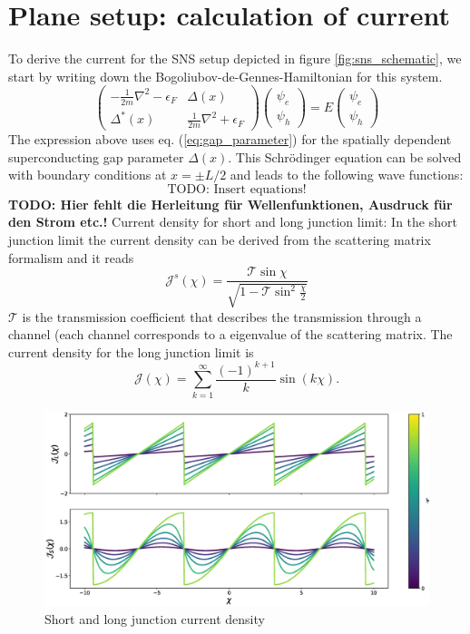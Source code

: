 \section{Plane setup: calculation of current}
To derive the current for the SNS setup depicted in figure \ref{fig:sns_schematic}, we start by writing down the Bogoliubov-de-Gennes-Hamiltonian for this system.
\begin{equation}
\begin{pmatrix}
-\frac{1}{2m} \nabla^2 - \epsilon_F & \Delta(x) \\
\Delta^*(x) & \frac{1}{2m} \nabla^2 + \epsilon_F 
\end{pmatrix}
\begin{pmatrix}
\psi_e \\
\psi_h
\end{pmatrix} = E 
\begin{pmatrix}
\psi_e\\
\psi_h
\end{pmatrix}
\end{equation}
The expression above uses eq. (\ref{eq:gap_parameter}) for the spatially dependent superconducting gap parameter $\Delta(x)$. This Schr\"odinger equation can be solved with boundary conditions at $x = \pm L/2$ and leads to the following wave functions:
\begin{equation}
\text{TODO: Insert equations!}
\end{equation}
\textbf{TODO: Hier fehlt die Herleitung f\"ur Wellenfunktionen, Ausdruck f\"ur den Strom etc.!}
Current density for short and long junction limit: 
In the short junction limit the current density can be derived from the scattering matrix formalism and it reads
\begin{equation}
\mathcal{J}^s (\chi) = \frac{\mathcal{T} \sin \chi}{\sqrt{1 - \mathcal{T} \sin^2 \frac{\chi}{2}}}
\end{equation}
$\mathcal{T}$ is the transmission coefficient that describes the transmission through a channel (each channel corresponds to a eigenvalue of the scattering matrix.
The current density for the long junction limit is
\begin{equation}
\mathcal{J}(\chi) = \sum_{k = 1}^{\infty} \frac{(-1)^{k+1}}{k} \sin( k \chi).
\end{equation}
\begin{figure}
\centering
\includegraphics[width=\textwidth]{figure/analyticalmodel/current_density_all}
\caption{Short and long junction current density}
\label{fig:current_density}
\end{figure}
